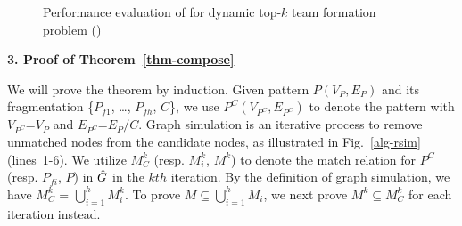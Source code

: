 \begin{figure}[tb!]
\begin{center}
\hspace{0.2ex}
\vspace{-2ex}

\end{center}
\vspace{-3.0ex}
\caption{Performance evaluation of \inc for dynamic top-$k$ team formation problem (\youtube)}
\label{exp-inc-youtube}
\vspace{-3.0ex}
\end{figure}


\noindent
{\textbf{3. Proof of Theorem~\ref{thm-compose}}}

We will prove the theorem by induction.
Given pattern $P(V_P,E_P)$ and its fragmentation \{${P}_{f1}$, \ldots, ${P}_{fh}$, $C$\},
we use $P^{C}(V_{P^{C}},E_{P^{C}})$ to denote the pattern with $V_{P^{C}}$=$V_P$ and $E_{P^{C}}$=$E_P/C$.
Graph simulation is an iterative process to remove unmatched nodes from the candidate nodes,
as illustrated in Fig.~\ref{alg-rsim} (lines~1-6).
We utilize $M_{C}^{k}$ (resp. $M_{i}^{k}$, $M^{k}$) to denote the match relation for $P^{C}$ (resp. $P_{fi}$, $P$) in $\hat{G}{}$ in the $kth$ iteration.
By the definition of graph simulation, we have $M_{C}^{k}$ = $\bigcup_{i=1}^{h}M_{i}^{k}$.
To prove $M\subseteq\bigcup_{i=1}^{h}M_{i}$,
we next prove $M^{k}\subseteq M_{C}^{k}$ for each iteration instead.

